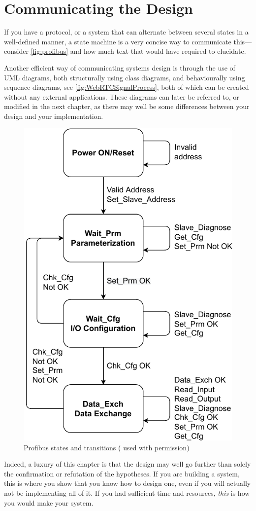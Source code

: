 \section{Communicating the Design}
\label{sec:communicating-design}


If you have a protocol, or a system that can alternate between several
states in a well-defined manner, a state machine is a very concise way to
communicate this---consider \autoref{fig:profibus} and how much text that
would have required to elucidate.

Another efficient way of communicating systems design is through the use of
\ac{UML} diagrams, both structurally using class diagrams, and behaviourally
using sequence diagrams, see \autoref{fig:WebRTCSignalProcess}, both of
which can be created without any external applications.  These diagrams can
later be referred to, or modified in the next chapter, as there may well be
some differences between your design and your implementation.

\begin{figure}
  \centering
  \includegraphics[width=.5\linewidth]{gfx/state_machine_profibus.pdf}
  \caption[Profibus states and transitions]{Profibus states and transitions (\cite{Overgaard2022:2022} used with permission)}
  \label{fig:profibus}
\end{figure}

Indeed, a luxury of this chapter is that the design may well go further than
solely the confirmation or refutation of the hypotheses.  If you are
building a system, this is where you show that you know how to design one,
even if you will actually not be implementing all of it.  If you had
sufficient time and resources, \emph{this} is how you would make your
system.

